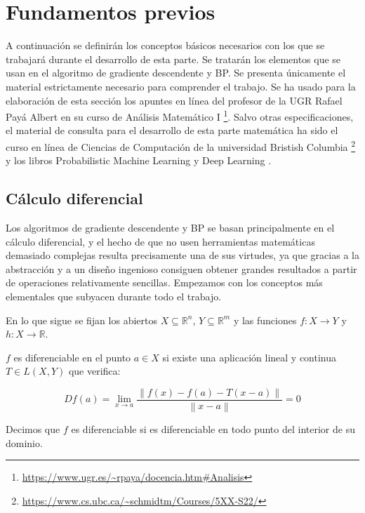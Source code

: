 \section{Fundamentos previos}
A continuación se definirán los conceptos básicos necesarios con los que se trabajará durante el desarrollo de esta parte. Se tratarán los elementos que se usan en el algoritmo de gradiente descendente y BP. Se presenta únicamente el material estrictamente necesario para comprender el trabajo. Se ha usado para la elaboración de esta sección los apuntes en línea del profesor de la UGR Rafael Payá Albert en su curso de Análisis Matemático I \footnote{\url{https://www.ugr.es/~rpaya/docencia.htm\#Analisis}}.  Salvo otras especificaciones, el material de consulta para el desarrollo de esta parte matemática ha sido el curso en línea de Ciencias de Computación de la universidad Bristish Columbia \footnote{\url{https://www.cs.ubc.ca/~schmidtm/Courses/5XX-S22/}} y los libros Probabilistic Machine Learning \cite{murphy2022probabilistic} y Deep Learning \cite{GoodFellowBook}.


\subsection{Cálculo diferencial}

Los algoritmos de gradiente descendente y BP se basan principalmente en el cálculo diferencial, y el hecho de que no usen herramientas matemáticas demasiado complejas resulta precisamente una de sus virtudes, ya que gracias a la abstracción y a un diseño ingenioso consiguen obtener grandes resultados a partir de operaciones relativamente sencillas. Empezamos con los conceptos más elementales que subyacen durante todo el trabajo.

En lo que sigue se fijan los abiertos $X \subseteq \mathbb{R}^n$, $Y \subseteq \mathbb{R}^m$ y las funciones $f: X \rightarrow Y$ y $h: X \rightarrow \mathbb{R}$.


\begin{definicion}
    $f$ es diferenciable en el punto $a \in X$ si existe una aplicación lineal y continua $T \in L(X,Y)$ que verifica:

    $$Df(a) = \displaystyle \lim_{x \to a} \frac{\left\| f(x)-f(a)-T(x-a)\right\|}{\left\| x-a\right\|}=0$$
    
    Decimos que $f$ es diferenciable si es diferenciable en todo punto del interior de su dominio.
\end{definicion}




